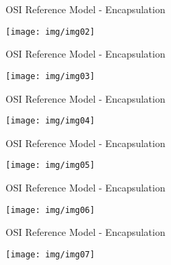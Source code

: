 \documentclass[pdflatex,compress,mathserif]{beamer}
\begin{document}
\begin{frame}{OSI Reference Model - Encapsulation}
	\begin{center}
		\texttt{[image: img/img02]}
	\end{center}
\end{frame}

\begin{frame}{OSI Reference Model - Encapsulation}
	\begin{center}
		\texttt{[image: img/img03]}
	\end{center}
\end{frame}

\begin{frame}{OSI Reference Model - Encapsulation}
	\begin{center}
		\texttt{[image: img/img04]}
	\end{center}
\end{frame}

\begin{frame}{OSI Reference Model - Encapsulation}
	\begin{center}
		\texttt{[image: img/img05]}
	\end{center}
\end{frame}

\begin{frame}{OSI Reference Model - Encapsulation}
	\begin{center}
		\texttt{[image: img/img06]}
	\end{center}
\end{frame}

\begin{frame}{OSI Reference Model - Encapsulation}
	\begin{center}
		\texttt{[image: img/img07]}
	\end{center}
\end{frame}
\end{document}
